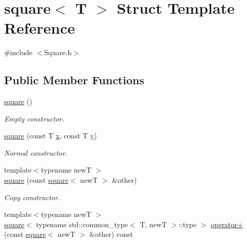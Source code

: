 \hypertarget{structsquare}{}\section{square$<$ T $>$ Struct Template Reference}
\label{structsquare}


{\ttfamily \#include $<$Square.\+h$>$}

\subsection*{Public Member Functions}
\begin{DoxyCompactItemize}
\item 
\hyperlink{structsquare_a671bc7b982fc848ab1222ead8512469e}{square} ()\hypertarget{structsquare_a671bc7b982fc848ab1222ead8512469e}{}\label{structsquare_a671bc7b982fc848ab1222ead8512469e}

\begin{DoxyCompactList}\small\item\em Empty constructor. \end{DoxyCompactList}\item 
\hyperlink{structsquare_a447dd893d605937230bba2861322df6d}{square} (const T \hyperlink{structsquare_a9a6e49424fdfad5fe4ce893bb57ba467}{x}, const T \hyperlink{structsquare_a7b976f9389a2fc271a332b5014dfd1e9}{y})\hypertarget{structsquare_a447dd893d605937230bba2861322df6d}{}\label{structsquare_a447dd893d605937230bba2861322df6d}

\begin{DoxyCompactList}\small\item\em Normal constructor. \end{DoxyCompactList}\item 
{\footnotesize template$<$typename newT $>$ }\\\hyperlink{structsquare_a3ae63c51c5ae7e6416d94febdfabdba1}{square} (const \hyperlink{structsquare}{square}$<$ newT $>$ \&other)\hypertarget{structsquare_a3ae63c51c5ae7e6416d94febdfabdba1}{}\label{structsquare_a3ae63c51c5ae7e6416d94febdfabdba1}

\begin{DoxyCompactList}\small\item\em Copy constructor. \end{DoxyCompactList}\item 
{\footnotesize template$<$typename newT $>$ }\\\hyperlink{structsquare}{square}$<$ typename std\+::common\+\_\+type$<$ T, newT $>$\+::type $>$ \hyperlink{structsquare_a6e236933a4268bd84fe91c7b31ccb8a3}{operator+} (const \hyperlink{structsquare}{square}$<$ newT $>$ \&other) const \hypertarget{structsquare_a6e236933a4268bd84fe91c7b31ccb8a3}{}\label{structsquare_a6e236933a4268bd84fe91c7b31ccb8a3}


\end{DoxyCompactItemize}
